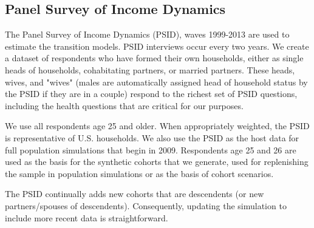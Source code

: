 \subsection{Panel Survey of Income Dynamics}
The Panel Survey of Income Dynamics (PSID), waves 1999-2013 are used to estimate the transition models. 
PSID interviews occur every two years.  We create a dataset of respondents who have formed their own households, either
as single heads of households, cohabitating partners, or married partners.  These heads, wives, and "wives" (males
are automatically assigned head of household status by the PSID if they are in a couple) respond to the richest
set of PSID questions, including the health questions that are critical for our purposes.

We use all respondents age 25 and older.  When appropriately weighted, the PSID is representative of U.S. households.  
We also use the PSID as the host data for full population simulations that begin in 2009.  Respondents age 25 and 26 
are used as the basis for the synthetic cohorts that we generate, used for replenishing the sample in population 
simulations or as the basis of cohort scenarios.  

The PSID continually adds new cohorts that are descendents (or new partners/spouses of descendents).  Consequently,
updating the simulation to include more recent data is straightforward.